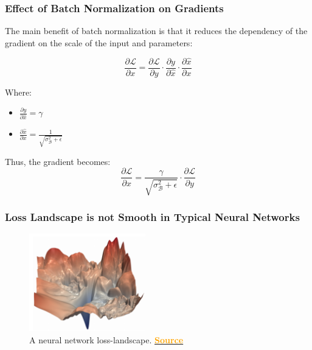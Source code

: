 \documentclass[serif, aspectratio=169]{beamer}
\begin{document}
\begin{frame}
    \frametitle{Effect of Batch Normalization on Gradients}

    The main benefit of batch normalization is that it reduces the dependency of the gradient on the scale of the input and parameters:

    \begin{equation}
        \frac{\partial \mathcal{L}}{\partial x} = \frac{\partial \mathcal{L}}{\partial y} \cdot \frac{\partial y}{\partial \hat{x}} \cdot \frac{\partial \hat{x}}{\partial x}
    \end{equation}

    Where:
    \begin{itemize}
        \item \centering \(\frac{\partial y}{\partial \hat{x}} = \gamma\) \\
        \item \(\frac{\partial \hat{x}}{\partial x} = \frac{1}{\sqrt{\sigma_{\mathcal{B}}^2 + \epsilon}}\)
    \end{itemize}

    Thus, the gradient becomes:
    \begin{equation}
        \frac{\partial \mathcal{L}}{\partial x} = \frac{\gamma}{\sqrt{\sigma_{\mathcal{B}}^2 + \epsilon}} \cdot \frac{\partial \mathcal{L}}{\partial y}
    \end{equation}
\end{frame}


\begin{frame}
    \frametitle{Loss Landscape is not Smooth in Typical Neural Networks}
    \begin{figure}
        \includegraphics[width=0.45\textwidth]{pic/Landscape-1.png}
        \caption{A neural network loss-landscape. \href{https://arxiv.org/pdf/1712.09913.pdf}{\textcolor{orange}{\textbf{Source}}}}
        \label{fig:Loss_Landscape}
    \end{figure}
\end{frame}
\end{document}

